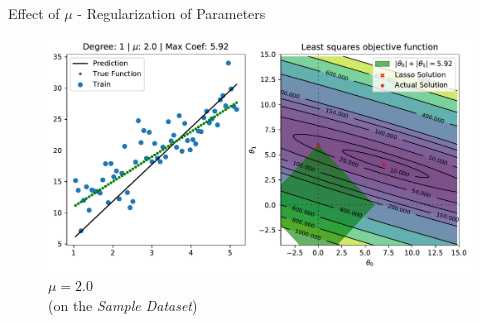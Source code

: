 \documentclass{beamer}
\begin{document}
\begin{frame}{Effect of $\mu$ - Regularization of Parameters}
\vspace{0.4cm}
\begin{figure}\includegraphics[width=0.9\linewidth]{../assets/lasso/figures/lasso_2.0.pdf}\caption{$\mu = 2.0$\\(on the \emph{Sample Dataset})}
\end{figure}
\end{frame}

%	


%
%
%
%
%
%
%
%
%
%
\end{document}
